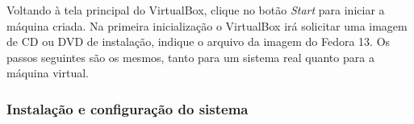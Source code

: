 





Voltando à tela principal do VirtualBox, clique no botão
\emph{Start} para iniciar a máquina criada. Na primeira
inicialização o VirtualBox irá solicitar uma imagem de CD ou DVD de
instalação, indique o arquivo da imagem do Fedora 13. Os passos
seguintes são os mesmos, tanto para um sistema real quanto para a
máquina virtual.

\subsubsection{Instalação e configuração do sistema}
\label{ssec:linux}



